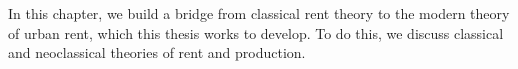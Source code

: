 In this chapter, we build a bridge from \gls{classical rent theory} to the modern theory of urban rent, which this thesis works to develop. To do this, %
we discuss classical and neoclassical theories of rent and production. 






%




 




